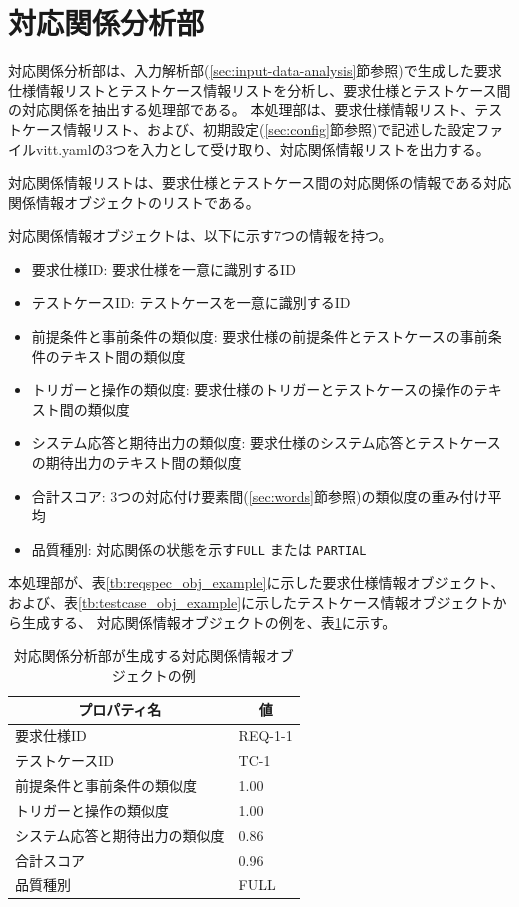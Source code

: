 \section{対応関係分析部}\label{sec:correspondence-analysis}
対応関係分析部は、入力解析部(\ref{sec:input-data-analysis}節参照)で生成した要求仕様情報リストとテストケース情報リストを分析し、要求仕様とテストケース間の対応関係を抽出する処理部である。
本処理部は、要求仕様情報リスト、テストケース情報リスト、および、初期設定(\ref{sec:config}節参照)で記述した設定ファイルvitt.yamlの3つを入力として受け取り、対応関係情報リストを出力する。

対応関係情報リストは、要求仕様とテストケース間の対応関係の情報である対応関係情報オブジェクトのリストである。

対応関係情報オブジェクトは、以下に示す7つの情報を持つ。
\begin{itemize}
    \item 要求仕様ID: 要求仕様を一意に識別するID
    \item テストケースID: テストケースを一意に識別するID
    \item 前提条件と事前条件の類似度: 要求仕様の前提条件とテストケースの事前条件のテキスト間の類似度
    \item トリガーと操作の類似度: 要求仕様のトリガーとテストケースの操作のテキスト間の類似度
    \item システム応答と期待出力の類似度: 要求仕様のシステム応答とテストケースの期待出力のテキスト間の類似度
    \item 合計スコア: $3$つの対応付け要素間(\ref{sec:words}節参照)の類似度の重み付け平均
    \item 品質種別: 対応関係の状態を示す\texttt{FULL} または \texttt{PARTIAL}
\end{itemize}

本処理部が、表\ref{tb:reqspec_obj_example}に示した要求仕様情報オブジェクト、および、表\ref{tb:testcase_obj_example}に示したテストケース情報オブジェクトから生成する、
対応関係情報オブジェクトの例を、表\ref{tb:mapping_obj_example}に示す。

\begin{table}[tp]
    \caption{対応関係分析部が生成する対応関係情報オブジェクトの例}\label{tb:mapping_obj_example}
    \centering
    \begin{tabular}{l|l}
        \multicolumn{1}{c|}{プロパティ名} & \multicolumn{1}{c}{値} \\
        \hline
        \hline
        要求仕様ID & REQ-1-1 \\
        \hline
        テストケースID & TC-1 \\
        \hline
        前提条件と事前条件の類似度 & 1.00 \\
        \hline
        トリガーと操作の類似度 & 1.00 \\
        \hline
        システム応答と期待出力の類似度 & 0.86 \\
        \hline
        合計スコア & 0.96 \\
        \hline
        品質種別 & FULL \\
        \hline
    \end{tabular}
\end{table}

